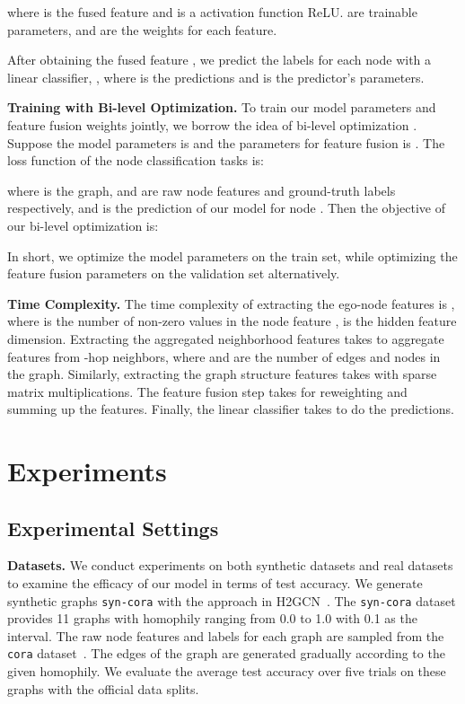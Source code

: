 \documentclass{article}
\theoremstyle{plain}
\newcommand{\mypar}[1]{{\vspace{0.05cm} \noindent \bf #1}}
\begin{document}
where  is the fused feature and  is a activation function ReLU.  are trainable parameters, and  are the weights for each feature.




After obtaining the fused feature , we predict the labels for each node with a linear classifier,
, where  is the predictions and  is the predictor's parameters.




\textbf{Training with Bi-level Optimization.}
To train our model parameters and feature fusion weights jointly, we borrow the idea of bi-level optimization \cite{liu2018darts,dong2019searching}. 
Suppose the model parameters is  and the parameters for feature fusion is . 
The loss function of the node classification tasks is:

where  is the graph,  and  are raw node features and ground-truth labels respectively, and  is the prediction of our model for node . Then the objective of our bi-level optimization is:


In short, we optimize the model parameters  on the train set, while optimizing the feature fusion parameters  on the validation set alternatively.

\mypar{Time Complexity.} The time complexity of extracting the ego-node features is , where  is the number of non-zero values in the node feature ,  is the hidden feature dimension. Extracting the aggregated neighborhood features takes  to aggregate features from -hop neighbors, where  and  are the number of edges and nodes in the graph. Similarly, extracting the graph structure features takes  with sparse matrix multiplications. The feature fusion step takes  for reweighting and summing up the features. Finally, the linear classifier takes  to do the predictions.



\section{Experiments} \label{sec:Experiments}



\subsection{Experimental Settings} \label{sec:ExpSet}
\textbf{Datasets.}
We conduct experiments on both synthetic datasets and real datasets to examine the efficacy of our model in terms of test accuracy. 
We generate synthetic graphs \texttt{syn-cora} with the approach in H2GCN~\cite{zhu2020beyond}. 
The \texttt{syn-cora} dataset provides 11 graphs with homophily ranging from 0.0 to 1.0 with 0.1 as the interval.
The raw node features and labels for each graph are sampled from the \texttt{cora} dataset~\cite{sen2008collective}. 
The edges of the graph are generated gradually according to the given homophily.  
We evaluate the average test accuracy over five trials on these graphs with the official data splits.
\end{document}
